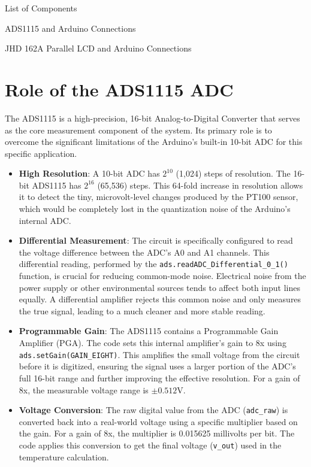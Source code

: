 \documentclass[conference]{IEEEtran}
\begin{document}
\begin{table}[!h]
  \centering
  \caption{List of Components}
  \label{table:list}
  
\end{table}

\begin{table}[h!]
  \centering
  \caption{ADS1115 and Arduino Connections}
  \label{table:ads_connections}
  
\end{table}

\begin{table}[h!]
  \centering
  \caption{JHD 162A Parallel LCD and Arduino Connections}
  \label{table:lcd_connections}
  
\end{table}

\section{Role of the ADS1115 ADC}
The ADS1115 is a high-precision, 16-bit Analog-to-Digital Converter that serves as the core measurement component of the system. Its primary role is to overcome the significant limitations of the Arduino's built-in 10-bit ADC for this specific application.

\begin{itemize}
    \item \textbf{High Resolution}: A 10-bit ADC has $2^{10}$ (1,024) steps of resolution. The 16-bit ADS1115 has $2^{16}$ (65,536) steps. This 64-fold increase in resolution allows it to detect the tiny, microvolt-level changes produced by the PT100 sensor, which would be completely lost in the quantization noise of the Arduino's internal ADC.
    \item \textbf{Differential Measurement}: The circuit is specifically configured to read the voltage difference between the ADC's A0 and A1 channels. This differential reading, performed by the \texttt{ads.readADC\_Differential\_0\_1()} function, is crucial for reducing common-mode noise. Electrical noise from the power supply or other environmental sources tends to affect both input lines equally. A differential amplifier rejects this common noise and only measures the true signal, leading to a much cleaner and more stable reading.
    \item \textbf{Programmable Gain}: The ADS1115 contains a Programmable Gain Amplifier (PGA). The code sets this internal amplifier's gain to 8x using \texttt{ads.setGain(GAIN\_EIGHT)}. This amplifies the small voltage from the circuit before it is digitized, ensuring the signal uses a larger portion of the ADC's full 16-bit range and further improving the effective resolution. For a gain of 8x, the measurable voltage range is $\pm0.512$V.
    \item \textbf{Voltage Conversion}: The raw digital value from the ADC (\texttt{adc\_raw}) is converted back into a real-world voltage using a specific multiplier based on the gain. For a gain of 8x, the multiplier is 0.015625 millivolts per bit. The code applies this conversion to get the final voltage (\texttt{v\_out}) used in the temperature calculation.
\end{itemize}
\end{document}
